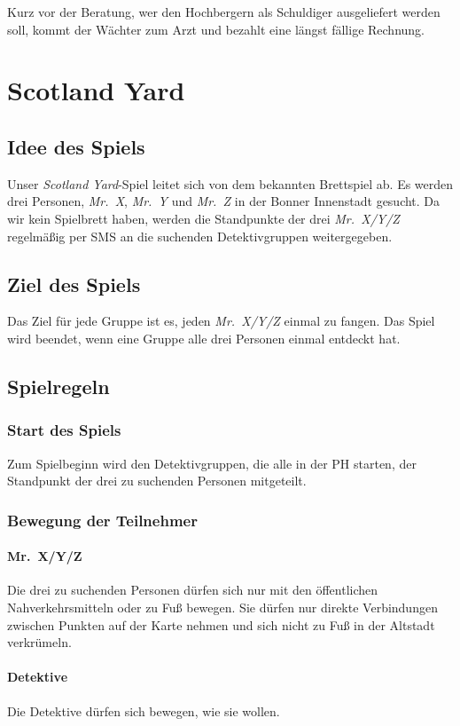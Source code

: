 Kurz vor der Beratung, wer den Hochbergern als Schuldiger ausgeliefert werden soll, kommt der Wächter zum Arzt und bezahlt eine längst fällige Rechnung.

\chapter{Scotland Yard}
\label{scotland-yard-regeln}
\section*{Idee des Spiels}
Unser \emph{Scotland Yard}-Spiel leitet sich von dem bekannten Brettspiel ab. Es werden
drei Personen, \emph{Mr.~X}, \emph{Mr.~Y} und \emph{Mr.~Z} in der Bonner Innenstadt gesucht. Da wir kein Spielbrett haben, werden die Standpunkte der drei \emph{Mr.~X/Y/Z} regelmäßig per SMS an die suchenden Detektivgruppen weitergegeben.
\section*{Ziel des Spiels}
Das Ziel für jede Gruppe ist es, jeden \emph{Mr.~X/Y/Z} einmal zu fangen. Das Spiel wird
beendet, wenn eine Gruppe alle drei Personen einmal entdeckt hat.
\section*{Spielregeln}
\subsection*{Start des Spiels}
Zum Spielbeginn wird den Detektivgruppen, die alle in der PH starten, der Standpunkt der
drei zu suchenden Personen mitgeteilt.
\subsection*{Bewegung der Teilnehmer}
\subsubsection*{Mr.~X/Y/Z}
Die drei zu suchenden Personen dürfen sich nur mit den öffentlichen
Nahverkehrsmitteln oder zu Fuß bewegen. Sie dürfen nur direkte Verbindungen
zwischen Punkten auf der Karte nehmen und sich nicht zu Fuß in der Altstadt
verkrümeln.
\subsubsection*{Detektive}
Die Detektive dürfen sich bewegen, wie sie wollen.
